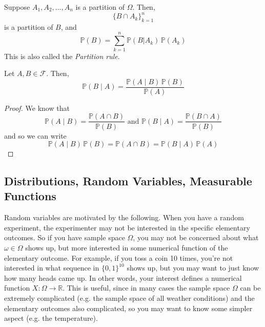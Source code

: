 \documentclass{article}
\begin{document}
      \begin{lemma}
        Suppose $A_1, A_2, ..., A_n$ is a partition of $\Omega$. Then, 
        \begin{equation}
          \{B \cap A_k\}_{k=1}^n
        \end{equation}
        is a partition of $B$, and 
        \begin{equation}
          \mathbb{P}(B) = \sum_{k=1}^n \mathbb{P} (B|A_k)\, \mathbb{P}(A_k)
        \end{equation}
        This is also called the \textit{Partition rule}. 
      \end{lemma}

      \begin{theorem}
        Let $A, B \in \mathcal{F}$. Then, 
        \begin{equation}
          \mathbb{P}(B \mid A) = \frac{\mathbb{P}(A \mid B) \, \mathbb{P}(B)}{\mathbb{P}(A)}
        \end{equation}
      \end{theorem}
      \begin{proof}
        We know that 
        \begin{equation}
          \mathbb{P}(A \mid B) = \frac{\mathbb{P} (A \cap B)}{\mathbb{P}(B)} \text{ and } \mathbb{P}(B \mid A) = \frac{\mathbb{P}(B \cap A)}{\mathbb{P}(B)}
        \end{equation}
        and so we can write 
        \begin{equation}
          \mathbb{P} (A \mid B) \, \mathbb{P}(B) = \mathbb{P}(A \cap B) = \mathbb{P}(B \mid A) \, \mathbb{P}(A)
        \end{equation}
      \end{proof}

  \subsection{Distributions, Random Variables, Measurable Functions}

    Random variables are motivated by the following. When you have a random experiment, the experimenter may not be interested in the specific elementary outcomes. So if you have sample space $\Omega$, you may not be concerned about what $\omega \in \Omega$ shows up, but more interested in some numerical function of the elementary outcome. For example, if you toss a coin 10 times, you're not interested in what sequence in $\{0, 1\}^{10}$ shows up, but you may want to just know how many heads came up. In other words, your interest defines a numerical function $X: \Omega \rightarrow \mathbb{R}$. This is useful, since in many cases the sample space $\Omega$ can be extremely complicated (e.g. the sample space of all weather conditions) and the elementary outcomes also complicated, so you may want to know some simpler aspect (e.g. the temperature). 
\end{document}

